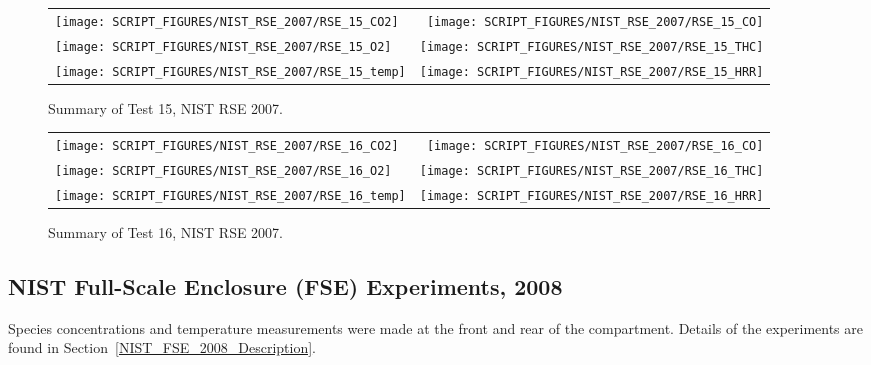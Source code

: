 \begin{figure}[p]
\begin{tabular*}{\textwidth}{l@{\extracolsep{\fill}}r}
\texttt{[image: SCRIPT\_FIGURES/NIST\_RSE\_2007/RSE\_15\_CO2]} &
\texttt{[image: SCRIPT\_FIGURES/NIST\_RSE\_2007/RSE\_15\_CO]} \\
\texttt{[image: SCRIPT\_FIGURES/NIST\_RSE\_2007/RSE\_15\_O2]} &
\texttt{[image: SCRIPT\_FIGURES/NIST\_RSE\_2007/RSE\_15\_THC]} \\
\texttt{[image: SCRIPT\_FIGURES/NIST\_RSE\_2007/RSE\_15\_temp]} &
\texttt{[image: SCRIPT\_FIGURES/NIST\_RSE\_2007/RSE\_15\_HRR]}
\end{tabular*}
\caption[Summary of Test 15, NIST RSE 2007]{Summary of Test 15, NIST RSE 2007.}
\label{NIST_RSE_2007_15}
\end{figure}

\begin{figure}[p]
\begin{tabular*}{\textwidth}{l@{\extracolsep{\fill}}r}
\texttt{[image: SCRIPT\_FIGURES/NIST\_RSE\_2007/RSE\_16\_CO2]} &
\texttt{[image: SCRIPT\_FIGURES/NIST\_RSE\_2007/RSE\_16\_CO]} \\
\texttt{[image: SCRIPT\_FIGURES/NIST\_RSE\_2007/RSE\_16\_O2]} &
\texttt{[image: SCRIPT\_FIGURES/NIST\_RSE\_2007/RSE\_16\_THC]} \\
\texttt{[image: SCRIPT\_FIGURES/NIST\_RSE\_2007/RSE\_16\_temp]} &
\texttt{[image: SCRIPT\_FIGURES/NIST\_RSE\_2007/RSE\_16\_HRR]}
\end{tabular*}
\caption[Summary of Test 16, NIST RSE 2007]{Summary of Test 16, NIST RSE 2007.}
\label{NIST_RSE_2007_16}
\end{figure}


\clearpage

\subsection{NIST Full-Scale Enclosure (FSE) Experiments, 2008}
\label{sec:NIST_FSE_2008}

Species concentrations and temperature measurements were made at the front and rear of the compartment. Details of the experiments are found in Section~\ref{NIST_FSE_2008_Description}.

